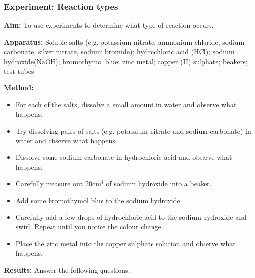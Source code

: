             \subsubsection{ Experiment: Reaction types}
            \nopagebreak
            \label{m38719*eip-190}\noindent{}\textbf{Aim: }\newline
    To use experiments to determine what type of reaction occurs.
\par 
\label{m38719*eip-1901}\noindent{}\textbf{Apparatus: }\newline
    Soluble salts (e.g. potassium nitrate, ammonium chloride, sodium carbonate, silver nitrate, sodium bromide); hydrochloric acid ($\mathrm{HCl}$); sodium hydroxide($\mathrm{NaOH}$); bromothymol blue; zinc metal; copper (II) sulphate; beakers; test-tubes
\par 
\label{m38719*eip-1902}\noindent{}\textbf{Method: }\label{m38719*id6231}\begin{itemize}[noitemsep]
            \item For each of the salts, dissolve a small amount in water and observe what happens.\item Try dissolving pairs of salts (e.g. potassium nitrate and sodium carbonate) in water and observe what happens.\item Dissolve some sodium carbonate in hydrochloric acid and observe what happens.\item Carefully measure out $20{\mathrm{cm}}^{3}$ of sodium hydroxide into a beaker. \item Add some bromothymol blue to the sodium hydroxide\item Carefully add a few drops of hydrochloric acid to the sodium hydroxide and swirl. Repeat until you notice the colour change.\item Place the zinc metal into the copper sulphate solution and observe what happens.\end{itemize}
\par 
\label{m38719*eip-1903}\noindent{}\textbf{Results: }\newline
    Answer the following questions:
